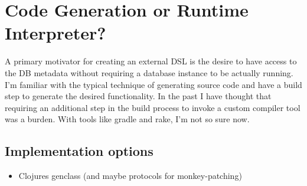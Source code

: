 \documentclass[10pt]{article}
\begin{document}
\section*{Code Generation or Runtime Interpreter?}
A primary motivator for creating an external DSL is the desire to have
access to the DB metadata without requiring a database instance to be
actually running. I'm familiar with the typical technique of
generating source code and have a build step to generate the desired
functionality. In the past I have thought that requiring an additional
step in the build process to invoke a custom compiler tool was a
burden. With tools like gradle and rake, I'm not so sure now.

\subsection*{Implementation options}
\begin{itemize}
  \item Clojures genclass (and maybe protocols for monkey-patching)
\end{itemize}

   



\end{document}
